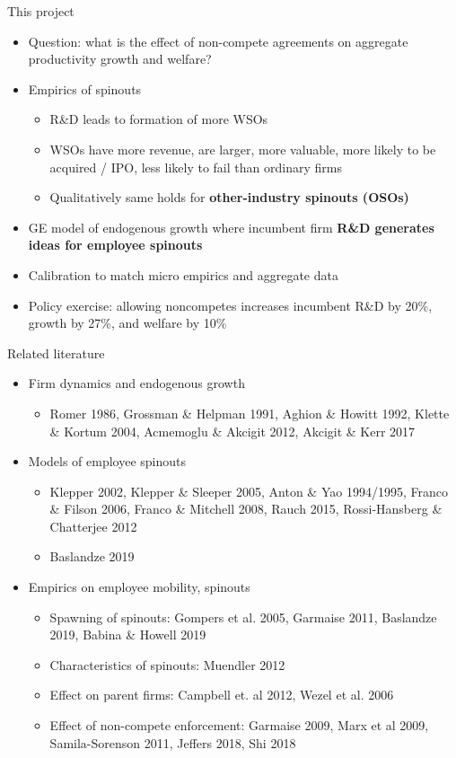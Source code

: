 \documentclass[english,usenames,dvipsnames]{beamer}
\begin{document}
\begin{frame}{This project}
\begin{itemize}
	\item Question: what is the effect of non-compete agreements on aggregate productivity growth and welfare?
	\item Empirics of spinouts
	\begin{itemize}
		\item R\&D leads to formation of more WSOs
		\item WSOs have more revenue, are larger, more valuable, more likely to be acquired / IPO, less likely to fail than ordinary firms
		\item Qualitatively same holds for \alert{\textbf{other-industry spinouts (OSOs)}}
	\end{itemize}
	\item GE model of endogenous growth where incumbent firm \alert{\textbf{R\&D generates ideas for employee spinouts}}
	\item Calibration to match micro empirics and aggregate data
	\item Policy exercise: allowing noncompetes increases incumbent R\&D by 20\%, growth by 27\%, and welfare by 10\%
\end{itemize}
\end{frame}

\begin{frame}{Related literature}
\begin{itemize}
\item Firm dynamics and endogenous growth
\begin{itemize}
\item Romer 1986, Grossman \& Helpman 1991, Aghion \& Howitt 1992, Klette \& Kortum 2004, Acmemoglu \& Akcigit 2012, Akcigit \& Kerr 2017
\end{itemize}
\item Models of employee spinouts
\begin{itemize}
\item Klepper 2002, Klepper \& Sleeper 2005, Anton \& Yao 1994/1995, Franco \& Filson 2006, Franco \& Mitchell 2008, Rauch 2015, Rossi-Hansberg \& Chatterjee 2012
\item Baslandze 2019
\end{itemize}
\item Empirics on employee mobility, spinouts
\begin{itemize}
\item Spawning of spinouts: Gompers et al. 2005, Garmaise 2011, Baslandze 2019, Babina \& Howell 2019
\item Characteristics of spinouts: Muendler 2012
\item Effect on parent firms: Campbell et. al 2012, Wezel et al. 2006
\item Effect of non-compete enforcement: Garmaise 2009, Marx et al 2009, Samila-Sorenson 2011, Jeffers 2018, Shi 2018
\end{itemize}
\end{itemize}
\end{frame}
\end{document}
